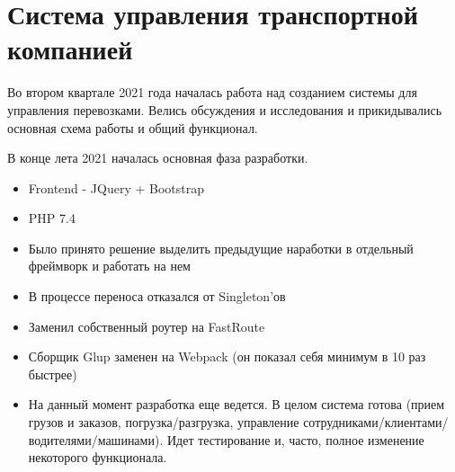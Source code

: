\documentclass[10pt]{tpl/developercv} %
\begin{document}
\section{Система управления транспортной компанией}
Во втором квартале 2021 года началась работа над созданием системы для управления перевозками. Велись обсуждения и исследования и прикидывались основная схема работы и общий функционал.

В конце лета 2021 началась основная фаза разработки.

\begin{itemize}
  \item Frontend - JQuery + Bootstrap
  \item PHP 7.4
  \item Было принято решение выделить предыдущие наработки в отдельный фреймворк и работать на нем
  \item В процессе переноса отказался от Singleton'ов
  \item Заменил собственный роутер на FastRoute
  \item Сборщик Glup заменен на Webpack (он показал себя минимум в 10 раз быстрее)
  \item На данный момент разработка еще ведется. В целом система готова (прием грузов и заказов, погрузка/разгрузка, управление сотрудниками/клиентами/водителями/машинами). Идет тестирование и, часто, полное изменение некоторого функционала.
\end{itemize}

\end{document}
